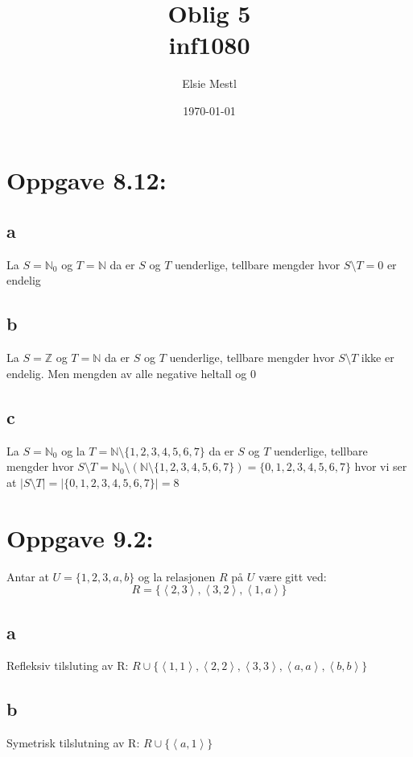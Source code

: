 \documentclass[a4paper, norsk, 10pt]{article}
\date{\today}
\title{Oblig 5 \\ inf1080}
\author{Elsie Mestl}
\begin{document}
\maketitle
\begin{flushleft}
\section*{Oppgave 8.12:}
\subsection*{a}

La $S= \mathbb{N}_{0}$ og $T = \mathbb{N}$ da er $S$ og $T$ uenderlige, tellbare mengder hvor $S \setminus T = {0}$ er endelig \\

\subsection*{b}
La $S= \mathbb{Z}$ og $T= \mathbb{N}$ da er $S$ og $T$ uenderlige, tellbare mengder hvor $S \setminus T$ ikke er endelig. Men mengden av alle negative heltall og 0 \\

\subsection*{c}
La $S = \mathbb{N}_{0}$ og la $T = \mathbb{N}\setminus \{1,2,3,4,5,6,7\}$ da er $S$ og $T$ uenderlige, tellbare mengder hvor $S \setminus T = \mathbb{N}_{0} \setminus (\mathbb{N}\setminus\{1,2,3,4,5,6,7\}) = \{0, 1, 2, 3, 4, 5, 6, 7\}$ hvor vi ser at $|S \setminus T| = |\{0, 1, 2, 3, 4, 5, 6, 7\}| = 8$


\section*{Oppgave 9.2:}
Antar at $U = \{1,2,3,a,b\}$ og la relasjonen $R$ på $U$ være gitt ved:
\[R = \{\left<2,3\right>, \left<3,2\right>, \left<1,a\right>\}\]

\subsection*{a}
Refleksiv tilsluting av R: \quad $R \cup \{\left<1,1\right>, \left<2,2\right>, \left<3,3\right>, \left<a,a\right>, \left<b,b\right> \}$


\subsection*{b}
Symetrisk tilslutning av R: \quad $R \cup \{\left<a,1\right>\}$


\end{flushleft}
\end{document}
